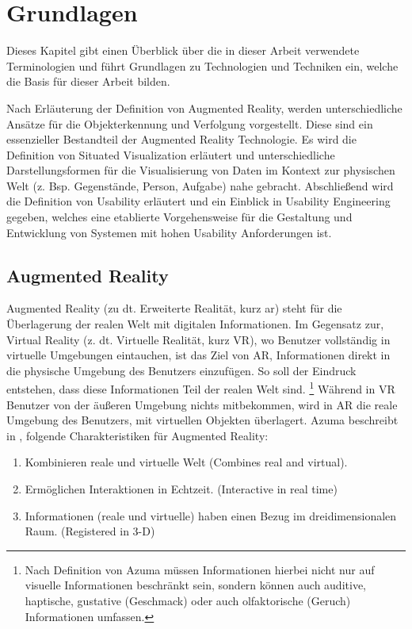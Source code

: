 \chapter{Grundlagen} \label{CapterFundamentals}

Dieses Kapitel gibt einen Überblick über die in dieser Arbeit verwendete Terminologien und führt Grundlagen zu Technologien und Techniken ein, welche die Basis für dieser Arbeit bilden. 

Nach Erläuterung der Definition von Augmented Reality, werden unterschiedliche Ansätze für die Objekterkennung und Verfolgung vorgestellt.  
Diese sind ein essenzieller Bestandteil der Augmented Reality Technologie. Es wird die Definition von Situated Visualization erläutert 
und unterschiedliche Darstellungsformen für die Visualisierung von Daten im Kontext zur physischen Welt (z. Bsp. Gegenstände, Person, Aufgabe) nahe gebracht. 
Abschließend wird die Definition von Usability erläutert und ein Einblick in Usability Engineering gegeben, welches eine etablierte Vorgehensweise für die 
Gestaltung und Entwicklung von Systemen mit hohen Usability Anforderungen ist. 

\section{Augmented Reality}

Augmented Reality (zu dt. Erweiterte Realität, kurz \gls{ar}) steht für die Überlagerung der realen Welt mit digitalen Informationen. \cite{Azuma1997,DieterSchmalstieg2016} Im Gegensatz zur, Virtual Reality (z. dt. Virtuelle Realität, kurz VR), wo Benutzer vollständig in virtuelle Umgebungen eintauchen,
ist das Ziel von AR, Informationen direkt in die physische Umgebung des Benutzers einzufügen. So soll der Eindruck entstehen, dass diese Informationen Teil der realen Welt sind. \footnote{Nach Definition von Azuma  müssen Informationen hierbei nicht nur auf visuelle Informationen beschränkt sein, 
sondern können auch auditive, haptische, gustative (Geschmack) oder auch olfaktorische (Geruch) Informationen umfassen.} \cite{Azuma1997} Während in VR Benutzer von der äußeren Umgebung nichts mitbekommen, wird in AR die reale Umgebung des Benutzers, mit virtuellen 
Objekten überlagert. Azuma beschreibt in \cite{Azuma1997}, folgende Charakteristiken für Augmented Reality: 

\begin{enumerate}
	\item Kombinieren reale und virtuelle Welt (Combines real and virtual).
	\item Ermöglichen Interaktionen in Echtzeit. (Interactive in real time)
	\item Informationen (reale und virtuelle) haben einen Bezug im dreidimensionalen Raum. (Registered in 3-D)
\end{enumerate}

